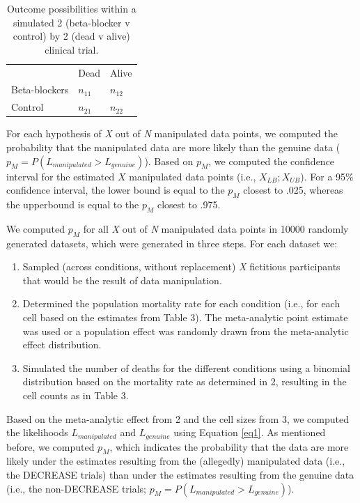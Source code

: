 \documentclass[]{article}
\begin{document}
\begin{longtable}[]{@{}lll@{}}
\caption{Outcome possibilities within a simulated 2 (beta-blocker v
control) by 2 (dead v alive) clinical trial.}\tabularnewline
\toprule
\begin{minipage}[t]{0.32\columnwidth}\raggedright\strut
\strut
\end{minipage} & \begin{minipage}[t]{0.32\columnwidth}\raggedright\strut
Dead\strut
\end{minipage} & \begin{minipage}[t]{0.32\columnwidth}\raggedright\strut
Alive\strut
\end{minipage}\tabularnewline
Beta-blockers & \(n_{11}\) & \(n_{12}\)\tabularnewline
Control & \(n_{21}\) & \(n_{22}\)\tabularnewline
\bottomrule
\end{longtable}

For each hypothesis of \emph{X} out of \emph{N} manipulated data points,
we computed the probability that the manipulated data are more likely
than the genuine data (\(p_M=P(L_{manipulated}>L_{genuine})\)). Based on
\(p_M\), we computed the confidence interval for the estimated \(X\)
manipulated data points (i.e., \(X_{LB};X_{UB}\)). For a 95\% confidence
interval, the lower bound is equal to the \(p_M\) closest to .025,
whereas the upperbound is equal to the \(p_M\) closest to .975.

We computed \(p_M\) for all \emph{X} out of \emph{N} manipulated data
points in 10000 randomly generated datasets, which were generated in
three steps. For each dataset we:

\begin{enumerate}
\def\labelenumi{\arabic{enumi}.}
\item
  Sampled (across conditions, without replacement) \emph{X} fictitious
  participants that would be the result of data manipulation.
\item
  Determined the population mortality rate for each condition (i.e., for
  each cell based on the estimates from Table 3). The meta-analytic
  point estimate was used or a population effect was randomly drawn from
  the meta-analytic effect distribution.
\item
  Simulated the number of deaths for the different conditions using a
  binomial distribution based on the mortality rate as determined in 2,
  resulting in the cell counts as in Table 3.
\end{enumerate}

Based on the meta-analytic effect from 2 and the cell sizes from 3, we
computed the likelihoods \(L_{manipulated}\) and \(L_{genuine}\) using
Equation \ref{eq1}. As mentioned before, we computed \(p_M\), which
indicates the probability that the data are more likely under the
estimates resulting from the (allegedly) manipulated data (i.e., the
DECREASE trials) than under the estimates resulting from the genuine
data (i.e., the non-DECREASE trials;
\(p_M=P(L_{manipulated}>L_{genuine})\)).
\end{document}
